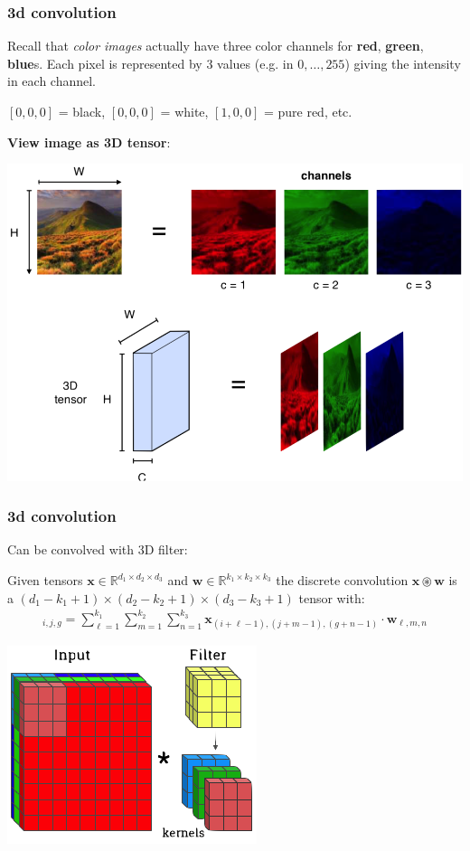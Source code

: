 \documentclass[handout,compress]{beamer}
\newcommand{\bv}[1]{\mathbf{#1}}
\newcommand{\R}{\mathbb{R}}
\begin{document}
	\begin{frame}
	\frametitle{3d convolution}
	Recall that \emph{color images} actually have three color channels for \textbf{red}, \textbf{green}, \textbf{blue}s. Each pixel is represented by 3 values (e.g. in $0,\ldots, 255$) giving the intensity in each channel. 
	
	$[0,0,0]$ = black, $[0,0,0]$ = white, $[1,0,0]$ = pure red, etc.
	
	\textbf{View image as 3D \alert{tensor}}:
	\vspace{-1em}
	\begin{center}
			\includegraphics[width=.6\textwidth]{image_tensor.png}
	\end{center}
	
	\end{frame}

	\begin{frame}
	\frametitle{3d convolution}
	Can be convolved with 3D filter:
				\small
	\begin{definition}
		Given tensors $\bv{x} \in \R^{d_1\times d_2 \times d_3}$ and $\bv{w} \in \R^{k_1\times k_2 \times k_3}$ the discrete convolution $\bv{x}\circledast \bv{w}$ is a $(d_1 - k_1 + 1)\times (d_2 - k_2 + 1) \times (d_3 - k_3 + 1)$ tensor with:
		\vspace{-1em}
		\begin{align*}
		[\bv{x}\circledast \bv{w}]_{i,j,g} = \sum_{\ell=1}^{k_1}\sum_{m=1}^{k_2}\sum_{n=1}^{k_3} \bv{x}_{(i + \ell -1),(j + m -1),(g + n -1)}\cdot \bv{w}_{\ell,m,n}
		\end{align*}
		\vspace{-1em}
	\end{definition}
	\begin{center}
	\includegraphics[width=.5\textwidth]{tensor.png}
	\end{center}
	
	\end{frame}
\end{document}
